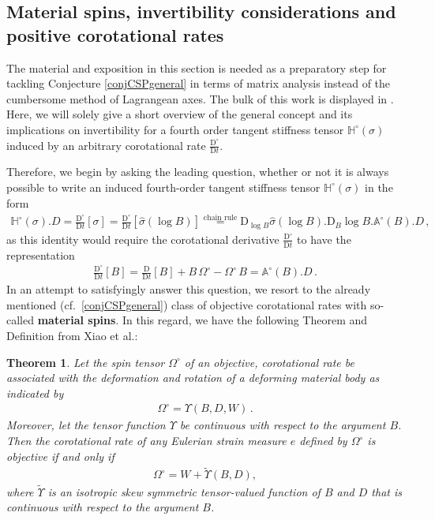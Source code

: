 \documentclass[10pt]{article}
\newcounter{theoremCounter}
\numberwithin{theoremCounter}{section}
\theoremstyle{plain}
\newtheorem{thm}[theoremCounter]{Theorem}
\theoremstyle{definition}
\newcommand{\DD}{\mathrm{D}}
\def\H{\mathbb{H}}
\numberwithin{equation}{section}
\begin{document}
\subsection{Material spins, invertibility considerations and positive corotational rates} \label{app13} \label{appendixAA}
%
The material and exposition in this section is needed as a preparatory step for tackling Conjecture \ref{conjCSPgeneral} in terms of matrix analysis instead of the cumbersome method of Lagrangean axes. The bulk of this work is displayed in \cite{neffkoro2024}. Here, we will solely give a short overview of the general concept and its implications on invertibility for a fourth order tangent stiffness tensor $\H^{\circ}(\sigma)$ induced by an arbitrary corotational rate $\frac{\DD^{\circ}}{\DD t}$.

Therefore, we begin by asking the leading question, whether or not it is always possible to write an induced fourth-order tangent stiffness tensor $\H^{\circ}(\sigma)$ in the form
	\begin{align}
	\label{eqfirsthalf}
	\H^{\circ}(\sigma).D = \frac{\DD^{\circ}}{\DD t}[\sigma] = \frac{\DD^{\circ}}{\DD t}[\widehat \sigma(\log B)] \overset{\text{chain rule}}{=} \DD_{\log B} \widehat \sigma(\log B). \DD_B \log B. \mathbb{A}^{\circ}(B).D \, ,
	\end{align}
as this identity would require the corotational derivative $\frac{\DD^{\circ}}{\DD t}$ to have the representation
	\begin{align}
	\label{eqisthatcorrect1}
	\frac{\DD^{\circ}}{\DD t}[B] = \frac{\DD}{\DD t}[B] + B \, \Omega^{\circ} - \Omega^{\circ} \, B = \mathbb{A}^{\circ}(B).D \, .
	\end{align}
In an attempt to satisfyingly answer this question, we resort to the already mentioned (cf.~\eqref{conjCSPgeneral}) class of objective corotational rates with so-called \textbf{material spins}. In this regard, we have the following Theorem \cite[p.22]{xiao98_1} and Definition \cite[p.25]{xiao98_1} from Xiao et al.:
%
\begin{thm} \label{thm3.19}
Let the spin tensor $\Omega^{\circ}$ of an objective, corotational rate be associated with the deformation and rotation of a deforming material body as indicated by 
	\begin{align}
	\Omega^{\circ} = \Upsilon(B, D, W)\,.
	\end{align}
Moreover, let the tensor function $\Upsilon$ be continuous with respect to the argument $B$. Then the corotational rate of any Eulerian strain measure $e$ defined by $\Omega^{\circ}$ is objective if and only if
	\begin{align}
	\label{eqxiao1}
	\Omega^{\circ} = W + \widetilde \Upsilon(B,D),
	\end{align}
where $\widetilde \Upsilon$ is an isotropic skew symmetric tensor-valued function of $B$ and $D$ that is continuous with respect to the argument $B$.
\end{thm}
\end{document}
